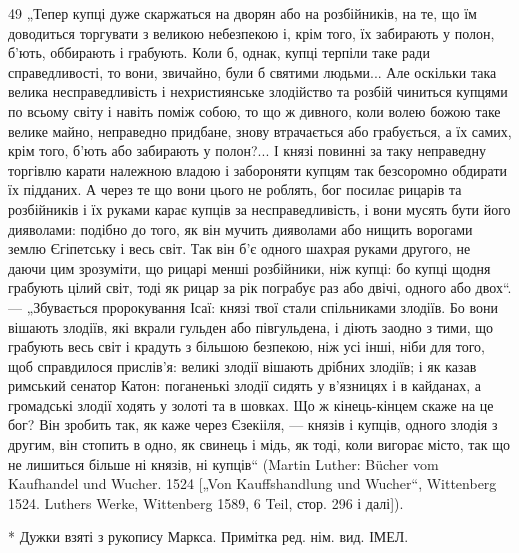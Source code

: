 49 „Тепер купці дуже скаржаться на дворян або на розбійників, на те, що
їм доводиться торгувати з великою небезпекою і, крім того, їх забирають у полон,
б’ють, оббирають і грабують. Коли б, однак, купці терпіли таке ради
справедливості, то вони, звичайно, були б святими людьми... Але оскільки така
велика несправедливість і нехристиянське злодійство та розбій чиниться купцями
по всьому світу і навіть поміж собою, то що ж дивного, коли волею
божою таке велике майно, неправедно придбане, знову втрачається або
грабується, а їх самих, крім того, б’ють або забирають у полон?... І князі
повинні за таку неправедну торгівлю карати належною владою і забороняти
купцям так безсоромно обдирати їх підданих. А через те що вони цього не
роблять, бог посилає рицарів та розбійників і їх руками карає купців за несправедливість,
і вони мусять бути його дияволами: подібно до того, як він мучить
дияволами або нищить ворогами землю Єгіпетську і весь світ. Так він б’є
одного шахрая руками другого, не даючи цим зрозуміти, що рицарі менші
розбійники, ніж купці: бо купці щодня грабують цілий світ, тоді як рицар за рік
пограбує раз або двічі, одного або двох“. — „Збувається пророкування Ісаї:
князі твої стали спільниками злодіїв. Бо вони вішають злодіїв, які вкрали гульден
або півгульдена, і діють заодно з тими, що грабують весь світ і крадуть
з більшою безпекою, ніж усі інші, ніби для того, щоб справдилося прислів’я:
великі злодії вішають дрібних злодіїв; і як казав римський сенатор Катон: поганенькі
злодії сидять у в’язницях і в кайданах, а громадські злодії ходять
у золоті та в шовках. Що ж кінець-кінцем скаже на це бог? Він зробить так,
як каже через Єзекііля, — князів і купців, одного злодія з другим, він стопить
в одно, як свинець і мідь, як тоді, коли вигорає місто, так що не лишиться більше
ні князів, ні купців“ (Martin Luther: Bücher vom Kaufhandel und Wucher. 1524
[„Von Kauffshandlung und Wucher“, Wittenberg 1524. Luthers Werke, Wittenberg
1589, 6 Teil, стор. 296 і далі]).

* Дужки взяті з рукопису Маркса. Примітка ред. нім. вид. ІМЕЛ.
